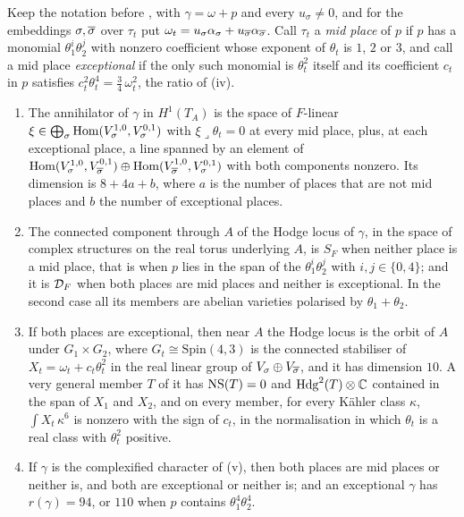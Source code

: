\begin{proposition}
\label{prop:quarticlocus}
Keep the notation before , with $\gamma=\omega+p$ and
every $u_{\sigma}\ne0$, and for the embeddings $\sigma,\overline{\sigma}$ over
$\tau_{t}$ put $\omega_{t}=u_{\sigma}\alpha_{\sigma}+u_{\overline{\sigma}}
\alpha_{\overline{\sigma}}$. Call $\tau_{t}$ a \emph{mid place} of $p$ if $p$ has a
monomial $\theta_{1}^{i}\theta_{2}^{j}$ with nonzero coefficient whose exponent
of $\theta_{t}$ is $1$, $2$ or $3$, and call a mid place \emph{exceptional} if
the only such monomial is $\theta_{t}^{2}$ itself and its coefficient $c_{t}$
in $p$ satisfies $c_{t}^{2}\theta_{t}^{4}=\frac34\,\omega_{t}^{2}$, the ratio
of (iv).
\begin{enumerate}[label=\textup{(\roman*)},leftmargin=2.6em,itemsep=2pt]
\item The annihilator of $\gamma$ in $H^{1}(T_{A})$ is the space of $F$-linear
  $\xi\in\bigoplus_{\sigma}\operatorname{Hom}(V_{\sigma}^{1,0},V_{\sigma}^{0,1})$ with
  $\xi\lrcorner\theta_{t}=0$ at every mid place, plus, at each exceptional
  place, a line spanned by an element of $\operatorname{Hom}(V_{\sigma}^{1,0},
  V_{\overline{\sigma}}^{0,1})\oplus\operatorname{Hom}(V_{\overline{\sigma}}^{1,0},V_{\sigma}^{0,1})$
  with both components nonzero. Its dimension is $8+4a+b$, where $a$ is the
  number of places that are not mid places and $b$ the number of exceptional
  places.
\item The connected component through $A$ of the Hodge locus of $\gamma$, in
  the space of complex structures on the real torus underlying $A$, is
  $S_{F}$ when neither place is a mid place, that is when $p$ lies in the
  span of the $\theta_{1}^{i}\theta_{2}^{j}$ with $i,j\in\{0,4\}$; and it is
  $\mathcal{D}_{F}$ when both places are mid places and neither is exceptional. In
  the second case all its members are abelian varieties polarised by
  $\theta_{1}+\theta_{2}$.
\item If both places are exceptional, then near $A$ the Hodge locus is the
  orbit of $A$ under $G_{1}\times G_{2}$, where $G_{t}\cong\mathrm{Spin}(4,3)$
  is the connected stabiliser of $X_{t}=\omega_{t}+c_{t}\theta_{t}^{2}$ in the
  real linear group of $V_{\sigma}\oplus V_{\overline{\sigma}}$, and it has
  dimension $10$. A very general member $T$ of it has $\mathrm{NS}(T)=0$ and
  $\mathrm{Hdg}^{2}(T)\otimes\mathbb{C}$ contained in the span of $X_{1}$ and $X_{2}$, and on
  every member, for every K\"ahler class $\kappa$, $\int X_{t}\,\kappa^{6}$ is
  nonzero with the sign of $c_{t}$, in the normalisation in which
  $\theta_{t}$ is a real class with $\theta_{t}^{2}$ positive.
\item If $\gamma$ is the complexified character of (v),
  then both places are mid places or neither is, and both are exceptional or
  neither is; and an exceptional $\gamma$ has $r(\gamma)=94$, or $110$ when
  $p$ contains $\theta_{1}^{4}\theta_{2}^{4}$.
\end{enumerate}
\end{proposition}

